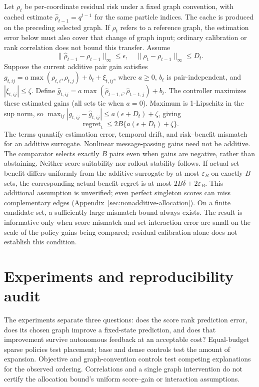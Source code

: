 Let $\rho_t$ be per-coordinate residual risk under a fixed graph convention, with cached estimate $\widehat\rho_{t-1}=q^{t-1}$ for the same particle indices. The cache is produced on the preceding selected graph. If $\rho_t$ refers to a reference graph, the estimation error below must also cover that change of graph input; ordinary calibration or rank correlation does not bound this transfer. Assume
\begin{equation}
 \|\widehat\rho_{t-1}-\rho_{t-1}\|_\infty\le\epsilon,
 \quad \|\rho_t-\rho_{t-1}\|_\infty\le D_t.
\end{equation}
Suppose the current additive pair gain satisfies
$g_{t,ij}=a\max(\rho_{t,i},\rho_{t,j})+b_t+\xi_{t,ij}$,
where $a\ge0$, $b_t$ is pair-independent, and $|\xi_{t,ij}|\le\zeta$. Define $\widehat g_{t,ij}=a\max(\widehat\rho_{t-1,i},\widehat\rho_{t-1,j})+b_t$. The controller maximizes these estimated gains (all sets tie when $a=0$). Maximum is 1-Lipschitz in the sup norm, so $\max_{ij}|g_{t,ij}-\widehat g_{t,ij}|\le a(\epsilon+D_t)+\zeta$, giving
\begin{equation}
 \operatorname{regret}_t\le 2B\{a(\epsilon+D_t)+\zeta\}.
\end{equation}
The terms quantify estimation error, temporal drift, and risk--benefit mismatch for an additive surrogate. Nonlinear message-passing gains need not be additive. The comparator selects exactly $B$ pairs even when gains are negative, rather than abstaining. Neither score suitability nor rollout stability follows.
If actual set benefit differs uniformly from the additive surrogate by at most $\varepsilon_B$ on exactly-$B$ sets, the corresponding actual-benefit regret is at most $2B\delta+2\varepsilon_B$. This additional assumption is unverified; even perfect singleton scores can miss complementary edges (Appendix~\ref{sec:nonadditive-allocation}).
On a finite candidate set, a sufficiently large mismatch bound always exists. The result is informative only when score mismatch and set-interaction error are small on the scale of the policy gains being compared; residual calibration alone does not establish this condition.

\section{Experiments and reproducibility audit}
The experiments separate three questions: does the score rank prediction error, does its chosen graph improve a fixed-state prediction, and does that improvement survive autonomous feedback at an acceptable cost? Equal-budget sparse policies test placement; base and dense controls test the amount of expansion. Objective and graph-convention controls test competing explanations for the observed ordering. Correlations and a single graph intervention do not certify the allocation bound's uniform score--gain or interaction assumptions.

